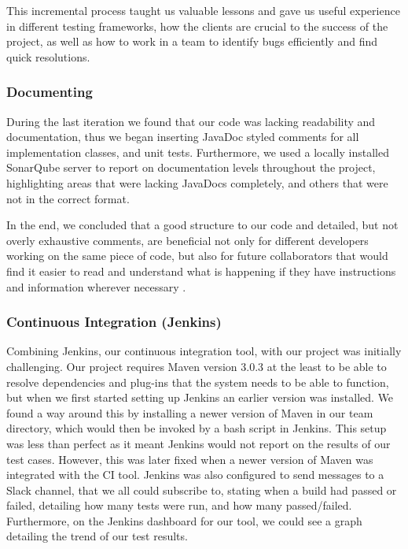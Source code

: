 \documentclass{l3proj}
\begin{document}
This incremental process taught us valuable lessons and gave us useful experience in different testing frameworks, how the clients are crucial to the success of the project, as well as how to work in a team to identify bugs efficiently and find quick resolutions.
\subsubsection{Documenting}
\label{sec:documenting}
During the last iteration we found that our code was lacking readability and documentation, thus we began inserting JavaDoc styled comments for all implementation classes, and unit tests. Furthermore, we used a locally installed SonarQube server to report on documentation levels throughout the project, highlighting areas that were lacking JavaDocs completely, and others that were not in the correct format.

In the end, we concluded that a good structure to our code and detailed, but not overly exhaustive comments, are beneficial not only for different developers working on the same piece of code, but also for future collaborators that would find it easier to read and understand what is happening if they have instructions and information wherever necessary \cite{Documentation}.
\subsubsection{Continuous Integration (Jenkins)}
\label{sec:jenkins}
Combining Jenkins, our continuous integration tool, with our project was initially challenging. Our project requires Maven version 3.0.3 at the least to be able to resolve dependencies and plug-ins that the system needs to be able to function, but when we first started setting up Jenkins an earlier version was installed. We found a way around this by installing a newer version of Maven in our team directory, which would then be invoked by a bash script in Jenkins. This setup was less than perfect as it meant Jenkins would not report on the results of our test cases. However, this was later fixed when a newer version of Maven was integrated with the CI tool. Jenkins was also configured to send messages to a Slack channel, that we all could subscribe to, stating when a build had passed or failed, detailing how many tests were run, and how many passed/failed. Furthermore, on the Jenkins dashboard for our tool, we could see a graph detailing the trend of our test results.
\end{document}
